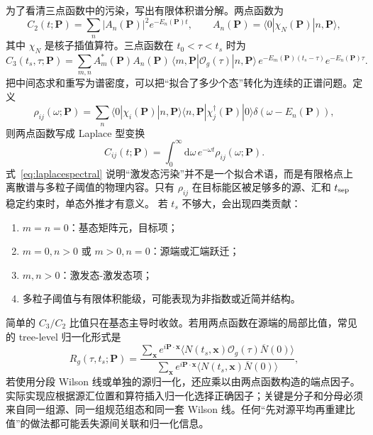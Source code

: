 \documentclass[UTF8,12pt,a4paper,twoside,openany]{ctexbook}
\newcommand{\dd}{\mathrm{d}}
\begin{document}
为了看清三点函数中的污染，写出有限体积谱分解。两点函数为
\begin{equation}
  C_2(t;\mathbf P)
  =\sum_n |A_n(\mathbf P)|^2e^{-E_n(\mathbf P)t},
  \qquad
  A_n(\mathbf P)=\langle 0|\chi_N(\mathbf P)|n,\mathbf P\rangle ,
  \label{eq:c2spectral}
\end{equation}
其中 \(\chi_N\) 是核子插值算符。三点函数在 \(t_0<\tau<t_s\) 时为
\begin{equation}
  C_3(t_s,\tau;\mathbf P)
  =\sum_{m,n}
  A_m^*(\mathbf P)A_n(\mathbf P)\,
  \langle m,\mathbf P|\mathcal O_g(\tau)|n,\mathbf P\rangle\,
  e^{-E_m(\mathbf P)(t_s-\tau)}
  e^{-E_n(\mathbf P)\tau}.
  \label{eq:c3spectral}
\end{equation}
把中间态求和重写为谱密度，可以把“拟合了多少个态”转化为连续的正谱问题。定义
\begin{equation}
  \rho_{ij}(\omega;\mathbf P)
  =\sum_n
  \langle 0|\chi_i(\mathbf P)|n,\mathbf P\rangle
  \langle n,\mathbf P|\chi_j^\dagger(\mathbf P)|0\rangle
  \delta\!\left(\omega-E_n(\mathbf P)\right),
  \label{eq:spectraldensity}
\end{equation}
则两点函数写成 Laplace 型变换
\begin{equation}
  C_{ij}(t;\mathbf P)
  =\int_0^\infty\dd\omega\,e^{-\omega t}
  \rho_{ij}(\omega;\mathbf P).
  \label{eq:laplacespectral}
\end{equation}
式~\eqref{eq:laplacespectral} 说明“激发态污染”并不是一个拟合术语，而是有限格点上离散谱与多粒子阈值的物理内容。只有 \(\rho_{ij}\) 在目标能区被足够多的源、汇和 \(t_{\rm sep}\) 稳定约束时，单态外推才有意义。
若 \(t_s\) 不够大，会出现四类贡献：
\begin{enumerate}
  \item \(m=n=0\)：基态矩阵元，目标项；
  \item \(m=0,n>0\) 或 \(m>0,n=0\)：源端或汇端跃迁；
  \item \(m,n>0\)：激发态-激发态项；
  \item 多粒子阈值与有限体积能级，可能表现为非指数或近简并结构。
\end{enumerate}
简单的 \(C_3/C_2\) 比值只在基态主导时收敛。若用两点函数在源端的局部比值，常见的 tree-level 归一化形式是
\begin{equation}
  R_g(\tau,t_s;\mathbf P)
  =\frac{\sum_{\mathbf x}e^{i\mathbf P\cdot\mathbf x}
  \langle N(t_s,\mathbf x)\mathcal O_g(\tau)\overline N(0)\rangle}
  {\sum_{\mathbf x}e^{i\mathbf P\cdot\mathbf x}
  \langle N(t_s,\mathbf x)\overline N(0)\rangle},
  \label{eq:ratio-equivalent}
\end{equation}
若使用分段 Wilson 线或单独的源归一化，还应乘以由两点函数构造的端点因子。实际实现应根据源汇位置和算符插入归一化选择正确因子；关键是分子和分母必须来自同一组源、同一组规范组态和同一套 Wilson 线。任何“先对源平均再重建比值”的做法都可能丢失源间关联和归一化信息。
\end{document}
